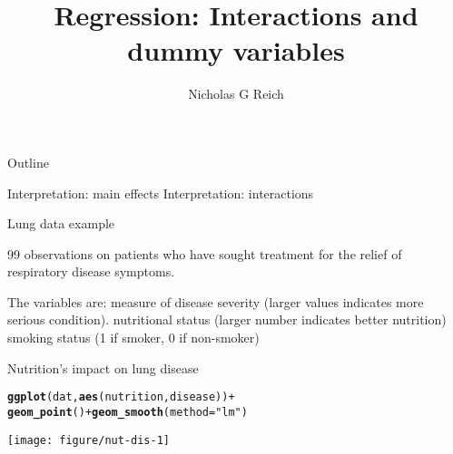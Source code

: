 \documentclass[table]{beamer}\usepackage[]{graphicx}\usepackage[]{color}
\title{Regression: Interactions and dummy variables}
\author{Nicholas G Reich}
\makeatletter
\def\maxwidth{ %
  \ifdim\Gin@nat@width>\linewidth
    \linewidth
  \else
    \Gin@nat@width
  \fi
}
\newcommand{\hlstr}[1]{\textcolor[rgb]{0.192,0.494,0.8}{#1}}%
\newcommand{\hlopt}[1]{\textcolor[rgb]{0,0,0}{#1}}%
\newcommand{\hlstd}[1]{\textcolor[rgb]{0.345,0.345,0.345}{#1}}%
\newcommand{\hlkwc}[1]{\textcolor[rgb]{0.333,0.667,0.333}{#1}}%
\newcommand{\hlkwd}[1]{\textcolor[rgb]{0.737,0.353,0.396}{\textbf{#1}}}%
\newenvironment{kframe}{%
 \def\at@end@of@kframe{}%
 \ifinner\ifhmode%
  \def\at@end@of@kframe{\end{minipage}}%
  \begin{minipage}{\columnwidth}%
 \fi\fi%
 \def\FrameCommand##1{\hskip\@totalleftmargin \hskip-\fboxsep
 \colorbox{shadecolor}{##1}\hskip-\fboxsep
     \hskip-\linewidth \hskip-\@totalleftmargin \hskip\columnwidth}%
 \MakeFramed {\advance\hsize-\width
   \@totalleftmargin\z@ \linewidth\hsize
   \@setminipage}}%
 {\par\unskip\endMakeFramed%
 \at@end@of@kframe}
\newenvironment{knitrout}{}{} %
\makeatother
\begin{document}
\begin{frame}[plain]
	\titlepage
\end{frame}







\begin{frame}{Outline}



\bi
  \myitem Interpretation: main effects
  \myitem Interpretation: interactions
\ei
	
\end{frame}




\begin{frame}[t]{Lung data example}

99 observations on patients who have sought treatment for the relief of respiratory disease symptoms. 

The variables are:
\bi
     measure of disease severity (larger values indicates more serious condition).
     nutritional status (larger number indicates better nutrition)
     smoking status (1 if smoker, 0 if non-smoker)
\ei


\end{frame}


\begin{frame}[fragile]{Nutrition's impact on lung disease}

\begin{knitrout}\tiny
{}\color{fgcolor}\begin{kframe}
\begin{alltt}
\hlkwd{ggplot}\hlstd{(dat,} \hlkwd{aes}\hlstd{(nutrition, disease))} \hlopt{+}
    \hlkwd{geom_point}\hlstd{()} \hlopt{+} \hlkwd{geom_smooth}\hlstd{(}\hlkwc{method}\hlstd{=}\hlstr{"lm"}\hlstd{)}
\end{alltt}
\end{kframe}
\texttt{[image: figure/nut-dis-1]} 

\end{knitrout}


\end{frame}
\end{document}
